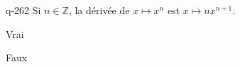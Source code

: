 \begin{truefalse}{q-262}
Si $n \in \mathbb Z$, la dérivée de $x\mapsto x^n$ est $x\mapsto nx^{n+1}$.
\item Vrai
\item* Faux
\end{truefalse}

